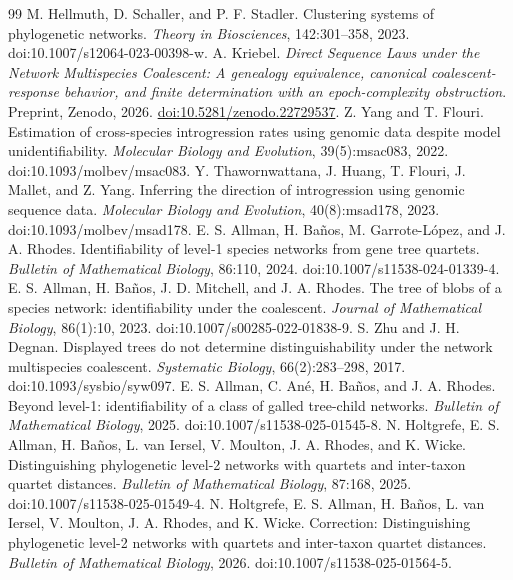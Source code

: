 \documentclass[11pt]{article}
\begin{document}
\begin{thebibliography}{99}
M. Hellmuth, D. Schaller, and P. F. Stadler. Clustering systems of phylogenetic networks.
\emph{Theory in Biosciences}, 142:301--358, 2023. doi:10.1007/s12064-023-00398-w.
A. Kriebel. \emph{Direct Sequence Laws under the Network Multispecies Coalescent: A genealogy equivalence, canonical coalescent-response behavior, and finite determination with an epoch-complexity obstruction}. Preprint, Zenodo, 2026. \href{https://doi.org/10.5281/zenodo.22729537}{doi:10.5281/zenodo.22729537}.
Z. Yang and T. Flouri. Estimation of cross-species introgression rates using genomic data despite model unidentifiability. \emph{Molecular Biology and Evolution}, 39(5):msac083, 2022. doi:10.1093/molbev/msac083.
Y. Thawornwattana, J. Huang, T. Flouri, J. Mallet, and Z. Yang. Inferring the direction of introgression using genomic sequence data. \emph{Molecular Biology and Evolution}, 40(8):msad178, 2023. doi:10.1093/molbev/msad178.
E. S. Allman, H. Ba\~nos, M. Garrote-L\'opez, and J. A. Rhodes. Identifiability of level-1 species networks from gene tree quartets. \emph{Bulletin of Mathematical Biology}, 86:110, 2024. doi:10.1007/s11538-024-01339-4.
E. S. Allman, H. Ba\~nos, J. D. Mitchell, and J. A. Rhodes. The tree of blobs of a species network: identifiability under the coalescent. \emph{Journal of Mathematical Biology}, 86(1):10, 2023. doi:10.1007/s00285-022-01838-9.
S. Zhu and J. H. Degnan. Displayed trees do not determine distinguishability under the network multispecies coalescent. \emph{Systematic Biology}, 66(2):283--298, 2017. doi:10.1093/sysbio/syw097.
E. S. Allman, C. An\'e, H. Ba\~nos, and J. A. Rhodes. Beyond level-1: identifiability of a class of galled tree-child networks. \emph{Bulletin of Mathematical Biology}, 2025. doi:10.1007/s11538-025-01545-8.
N. Holtgrefe, E. S. Allman, H. Ba\~nos, L. van Iersel, V. Moulton, J. A. Rhodes, and K. Wicke. Distinguishing phylogenetic level-2 networks with quartets and inter-taxon quartet distances. \emph{Bulletin of Mathematical Biology}, 87:168, 2025. doi:10.1007/s11538-025-01549-4.
N. Holtgrefe, E. S. Allman, H. Ba\~nos, L. van Iersel, V. Moulton, J. A. Rhodes, and K. Wicke. Correction: Distinguishing phylogenetic level-2 networks with quartets and inter-taxon quartet distances. \emph{Bulletin of Mathematical Biology}, 2026. doi:10.1007/s11538-025-01564-5.
\end{thebibliography}
\end{document}
